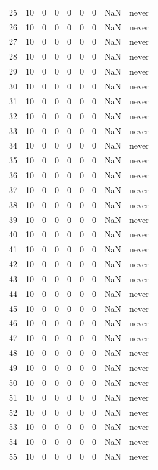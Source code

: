 \begin{longtable}{rrrrrrrrl}
25 & 10 & 0 & 0 & 0 & 0 & 0 & NaN & never \\
26 & 10 & 0 & 0 & 0 & 0 & 0 & NaN & never \\
27 & 10 & 0 & 0 & 0 & 0 & 0 & NaN & never \\
28 & 10 & 0 & 0 & 0 & 0 & 0 & NaN & never \\
29 & 10 & 0 & 0 & 0 & 0 & 0 & NaN & never \\
30 & 10 & 0 & 0 & 0 & 0 & 0 & NaN & never \\
31 & 10 & 0 & 0 & 0 & 0 & 0 & NaN & never \\
32 & 10 & 0 & 0 & 0 & 0 & 0 & NaN & never \\
33 & 10 & 0 & 0 & 0 & 0 & 0 & NaN & never \\
34 & 10 & 0 & 0 & 0 & 0 & 0 & NaN & never \\
35 & 10 & 0 & 0 & 0 & 0 & 0 & NaN & never \\
36 & 10 & 0 & 0 & 0 & 0 & 0 & NaN & never \\
37 & 10 & 0 & 0 & 0 & 0 & 0 & NaN & never \\
38 & 10 & 0 & 0 & 0 & 0 & 0 & NaN & never \\
39 & 10 & 0 & 0 & 0 & 0 & 0 & NaN & never \\
40 & 10 & 0 & 0 & 0 & 0 & 0 & NaN & never \\
41 & 10 & 0 & 0 & 0 & 0 & 0 & NaN & never \\
42 & 10 & 0 & 0 & 0 & 0 & 0 & NaN & never \\
43 & 10 & 0 & 0 & 0 & 0 & 0 & NaN & never \\
44 & 10 & 0 & 0 & 0 & 0 & 0 & NaN & never \\
45 & 10 & 0 & 0 & 0 & 0 & 0 & NaN & never \\
46 & 10 & 0 & 0 & 0 & 0 & 0 & NaN & never \\
47 & 10 & 0 & 0 & 0 & 0 & 0 & NaN & never \\
48 & 10 & 0 & 0 & 0 & 0 & 0 & NaN & never \\
49 & 10 & 0 & 0 & 0 & 0 & 0 & NaN & never \\
50 & 10 & 0 & 0 & 0 & 0 & 0 & NaN & never \\
51 & 10 & 0 & 0 & 0 & 0 & 0 & NaN & never \\
52 & 10 & 0 & 0 & 0 & 0 & 0 & NaN & never \\
53 & 10 & 0 & 0 & 0 & 0 & 0 & NaN & never \\
54 & 10 & 0 & 0 & 0 & 0 & 0 & NaN & never \\
55 & 10 & 0 & 0 & 0 & 0 & 0 & NaN & never \\

\end{longtable}
